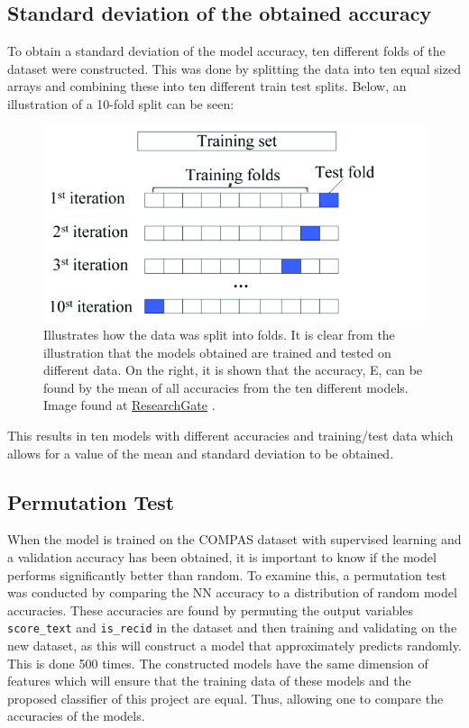 \documentclass[11pt, fleqn, titlepage]{article}
\begin{document}
	\subsection{Standard deviation of the obtained accuracy} \label{standard_deviation}
	To obtain a standard deviation of the model accuracy, ten different folds of the dataset were constructed. This was done by splitting the data into ten equal sized arrays and combining these into ten different train test splits. Below, an illustration of a 10-fold split can be seen: 
	
	\begin{figure}[H]
		\centering
		\includegraphics[width=0.7\linewidth]{imgs/kfolds2}
		\caption{Illustrates how the data was split into folds. It is clear from the illustration that the models obtained are trained and tested on different data. On the right, it is shown that the accuracy, E, can be found by the mean of all accuracies from the ten different models. Image found at \href{https://www.researchgate.net/figure/Diagram-of-k-fold-cross-validation-with-k-10-Image-from-Karl-Rosaen-Log_fig1_332370436}{ResearchGate} \cite{researchgate}. }
		\label{fig:kfolds}
	\end{figure}
	\noindent
	This results in ten models with different accuracies and training/test data which allows for a value of the mean and standard deviation to be obtained.
	
	\subsection{Permutation Test}\label{permutation_test}

	When the model is trained on the COMPAS dataset with supervised learning and a validation accuracy has been obtained, it is important to know if the model performs significantly better than random. To examine this, a permutation test was conducted by comparing the NN accuracy to a distribution of random model accuracies. These accuracies are found by permuting the output variables \texttt{score\_text} and \texttt{is\_recid} in the dataset and then training and validating on the new dataset, as this will construct a model that approximately predicts randomly. This is done 500 times. The constructed models have the same dimension of features which will ensure that the training data of these models and the proposed classifier of this project are equal. Thus, allowing one to compare the accuracies of the models. 
	
\end{document}
